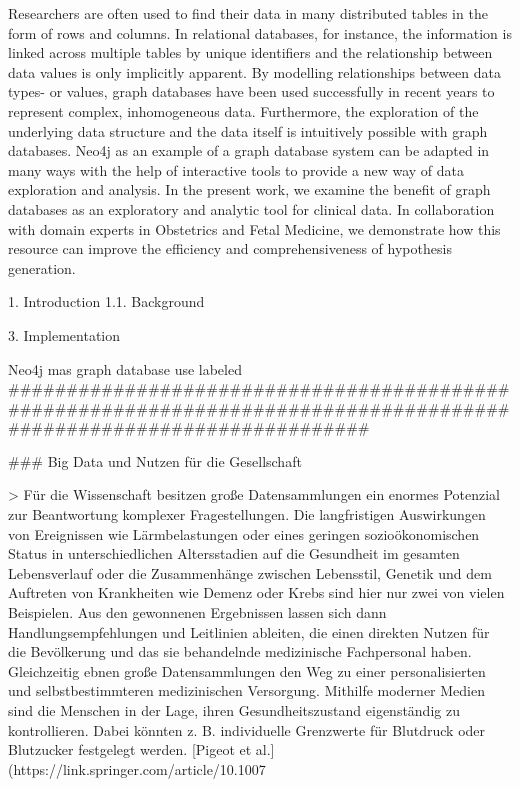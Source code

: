 Researchers are often used to find their data in many distributed tables in the form of rows and columns. In relational databases, for instance, the information is linked across multiple tables by unique identifiers and the relationship between data values is only implicitly apparent. By modelling relationships between data types- or values, graph databases have been used successfully in recent years to represent complex, inhomogeneous data. Furthermore, the exploration of the underlying data structure and the data itself is intuitively possible with graph databases. Neo4j as an example of a graph database system can be adapted in many ways with the help of interactive tools to provide a new way of data exploration and analysis. In the present work, we examine the benefit of graph databases as an exploratory and analytic tool for clinical data. In collaboration with domain experts in Obstetrics and Fetal Medicine, we demonstrate how this resource can improve the efficiency and comprehensiveness of hypothesis generation.

1. Introduction
1.1. Background

3. Implementation

Neo4j mas graph database use labeled 
#####################################################################################################################




### Big Data und Nutzen für die Gesellschaft

> Für die Wissenschaft besitzen große Datensammlungen ein enormes Potenzial zur Beantwortung komplexer Fragestellungen. Die langfristigen Auswirkungen von Ereignissen wie Lärmbelastungen oder eines geringen sozioökonomischen Status in unterschiedlichen Altersstadien auf die Gesundheit im gesamten Lebensverlauf oder die Zusammenhänge zwischen Lebensstil, Genetik und dem Auftreten von Krankheiten wie Demenz oder Krebs sind hier nur zwei von vielen Beispielen. Aus den gewonnenen Ergebnissen lassen sich dann Handlungsempfehlungen und Leitlinien ableiten, die einen direkten Nutzen für die Bevölkerung und das sie behandelnde medizinische Fachpersonal haben. Gleichzeitig ebnen große Datensammlungen den Weg zu einer personalisierten und selbstbestimmteren medizinischen Versorgung. Mithilfe moderner Medien sind die Menschen in der Lage, ihren Gesundheitszustand eigenständig zu kontrollieren. Dabei könnten z. B. individuelle Grenzwerte für Blutdruck oder Blutzucker festgelegt werden. [Pigeot et al.](https://link.springer.com/article/10.1007%


